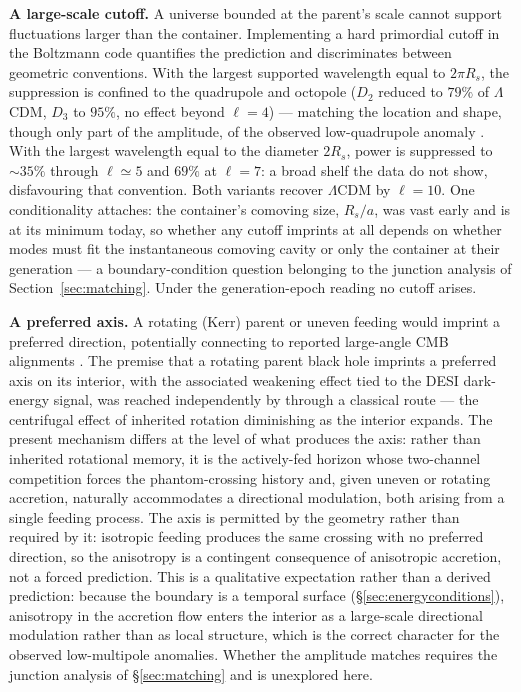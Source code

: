 \documentclass[11pt,a4paper]{article}
\newcommand{\lcdm}{\ensuremath{\Lambda}CDM}
\begin{document}
\textbf{A large-scale cutoff.} A universe bounded at the parent's scale cannot support fluctuations larger than the container. Implementing a hard primordial cutoff in the Boltzmann code quantifies the prediction and discriminates between geometric conventions. With the largest supported wavelength equal to $2\pi R_s$, the suppression is confined to the quadrupole and octopole ($D_2$ reduced to $79\%$ of \lcdm{}, $D_3$ to $95\%$, no effect beyond $\ell=4$) --- matching the location and shape, though only part of the amplitude, of the observed low-quadrupole anomaly \citep{Schwarz2016,PlanckIsotropy}. With the largest wavelength equal to the diameter $2R_s$, power is suppressed to $\sim35\%$ through $\ell\simeq5$ and $69\%$ at $\ell=7$: a broad shelf the data do not show, disfavouring that convention. Both variants recover \lcdm{} by $\ell=10$. One conditionality attaches: the container's comoving size, $R_s/a$, was vast early and is at its minimum today, so whether any cutoff imprints at all depends on whether modes must fit the instantaneous comoving cavity or only the container at their generation --- a boundary-condition question belonging to the junction analysis of Section~\ref{sec:matching}. Under the generation-epoch reading no cutoff arises.

\textbf{A preferred axis.} A rotating (Kerr) parent or uneven feeding would imprint a preferred direction, potentially connecting to reported large-angle CMB alignments \citep{LandMagueijo2005,Schwarz2016}. The premise that a rotating parent black hole imprints a preferred axis on its interior, with the associated weakening effect tied to the DESI dark-energy signal, was reached independently by \citet{Poplawski2019axis} through a classical route --- the centrifugal effect of inherited rotation diminishing as the interior expands. The present mechanism differs at the level of what produces the axis: rather than inherited rotational memory, it is the actively-fed horizon whose two-channel competition forces the phantom-crossing history and, given uneven or rotating accretion, naturally accommodates a directional modulation, both arising from a single feeding process. The axis is permitted by the geometry rather than required by it: isotropic feeding produces the same crossing with no preferred direction, so the anisotropy is a contingent consequence of anisotropic accretion, not a forced prediction. This is a qualitative expectation rather than a derived prediction: because the boundary is a temporal surface (\S\ref{sec:energyconditions}), anisotropy in the accretion flow enters the interior as a large-scale directional modulation rather than as local structure, which is the correct character for the observed low-multipole anomalies. Whether the amplitude matches requires the junction analysis of \S\ref{sec:matching} and is unexplored here.
\end{document}
